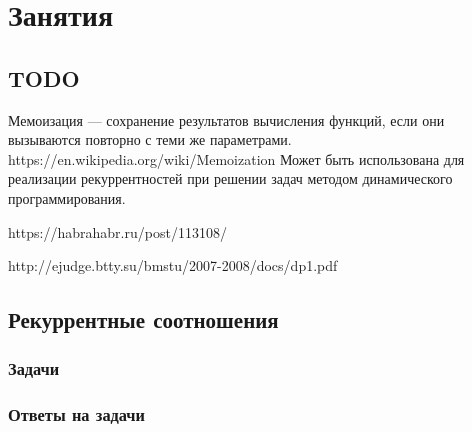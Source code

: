 \documentclass[14pt,openany]{book}
\begin{document}
\begingroup
\hypersetup{linkcolor=black}
\tableofcontents
\endgroup

\clearpage

\part{Занятия}

\chapter{TODO}

Мемоизация --- сохранение результатов вычисления функций, если они вызываются повторно с теми же параметрами.
https://en.wikipedia.org/wiki/Memoization
Может быть использована для реализации рекуррентностей при решении задач методом динамического программирования.

https://habrahabr.ru/post/113108/

http://ejudge.btty.su/bmstu/2007-2008/docs/dp1.pdf

\chapter{Рекуррентные соотношения}



\section{Задачи}



\section{Ответы на задачи}
\end{document}
